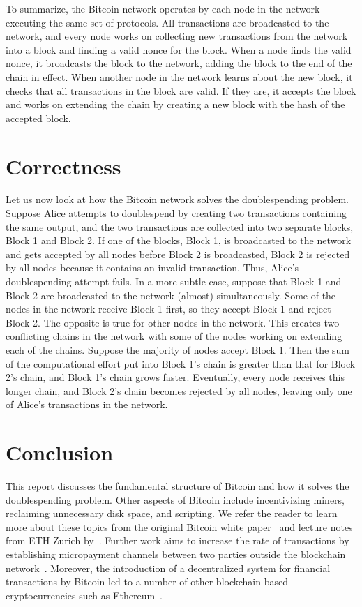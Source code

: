 \documentclass{article}
\begin{document}
To summarize, the Bitcoin network operates by each node in the network executing
the same set of protocols. All transactions are broadcasted to the network, and
every node works on collecting new transactions from the network into a block
and finding a valid nonce for the block. When a node finds the valid nonce, it
broadcasts the block to the network, adding the block to the end of the chain in
effect. When another node in the network learns about the new block, it checks
that all transactions in the block are valid. If they are, it accepts the block
and works on extending the chain by creating a new block with the hash of the
accepted block.

\section{Correctness}

Let us now look at how the Bitcoin network solves the doublespending problem.
Suppose Alice attempts to doublespend by creating two transactions containing
the same output, and the two transactions are collected into two separate
blocks, Block 1 and Block 2. If one of the blocks, Block 1, is broadcasted to
the network and gets accepted by all nodes before Block 2 is broadcasted, Block
2 is rejected by all nodes because it contains an invalid transaction. Thus,
Alice’s doublespending attempt fails. In a more subtle case, suppose that Block
1 and Block 2 are broadcasted to the network (almost) simultaneously. Some of
the nodes in the network receive Block 1 first, so they accept Block 1 and
reject Block 2. The opposite is true for other nodes in the network. This
creates two conflicting chains in the network with some of the nodes working on
extending each of the chains. Suppose the majority of nodes accept Block 1. Then
the sum of the computational effort put into Block 1’s chain is greater than
that for Block 2’s chain, and Block 1’s chain grows faster. Eventually, every
node receives this longer chain, and Block 2’s chain becomes rejected by all
nodes, leaving only one of Alice’s transactions in the network.

\section{Conclusion}

This report discusses the fundamental structure of Bitcoin and how it solves the
doublespending problem. Other aspects of Bitcoin include incentivizing miners,
reclaiming unnecessary disk space, and scripting. We refer the reader to learn
more about these topics from the original Bitcoin white paper~\citep{Nakamoto08}
and lecture notes from ETH Zurich by~\citeauthor{ETH15}. Further work aims to
increase the rate of transactions  by establishing micropayment channels between
two parties outside the blockchain network~\citep{Decker15}. Moreover, the
introduction of a decentralized system for financial transactions by Bitcoin led
to a number of other blockchain-based cryptocurrencies such as
Ethereum~\citep{Buterin14}.



\end{document}
